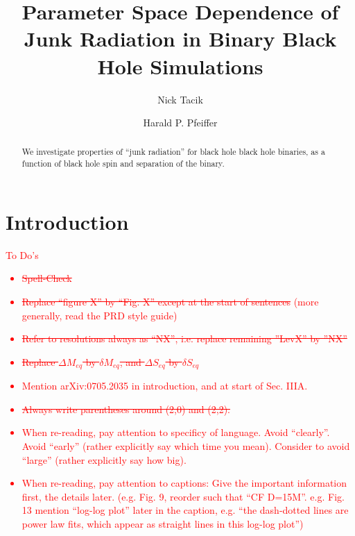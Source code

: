 \documentclass[aps,prd,amsmath,floatfix,twocolumn,superscriptaddress,nofootinbib,showpacs]{revtex4-1}
\theoremstyle{plain}
\theoremstyle{definition}
\newcommand{\red}[1]{\textcolor{Red}{#1}}
\begin{document}
\title[Parameter Space Dependence of Junk Radiation in Binary Black
Hole Simulations]{Parameter Space Dependence of Junk Radiation in
  Binary Black Hole Simulations}

\newcommand{\CITA}{\address{Canadian Institute for Theoretical
    Astrophysics, University of Toronto, 60~St.~George Street,
    Toronto, Ontario M5S 3H8, Canada}} %

\author{Nick Tacik}\CITA
\author{Harald P. Pfeiffer}\CITA


\begin{abstract}
  We investigate properties of ``junk radiation'' for black hole black hole binaries, as a function of black hole spin and separation of the binary.
\end{abstract}

\maketitle

\newpage

\section{Introduction}
\label{sec:introduction}


\red{To Do's
\begin{itemize}
\item \sout{Spell-Check}
\item \sout{Replace  ``figure X'' by ``Fig. X'' except at the start of sentences} (more generally, read the PRD style guide)
\item \sout{Refer to resolutions always as ``NX'', i.e. replace remaining ''LevX'' by ''NX''}
\item \sout{Replace $\Delta M_{eq}$ by $\delta M_{eq}$, and $\Delta S_{eq}$ by $\delta S_{eq}$}
\item Mention arXiv:0705.2035  in introduction, and at start of Sec. IIIA.
\item \sout{Always write parentheses around (2,0) and (2,2).}
\item When re-reading, pay attention to specificy of language.  Avoid ``clearly''. Avoid ``early'' (rather explicitly say which time you mean).  Consider to avoid ``large'' (rather explicitly say how big).  
\item When re-reading, pay attention to captions: Give the important
  information first, the details later.  (e.g. Fig. 9, reorder such
  that ``CF D=15M''.  e.g. Fig. 13 mention ``log-log plot'' later in
  the caption, e.g. ``the dash-dotted lines are power law fits, which
  appear as straight lines in this log-log plot'')
\end{itemize}
}
\end{document}
